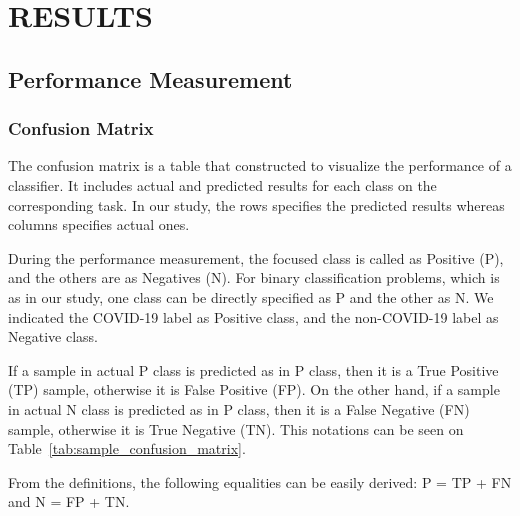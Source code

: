 \chapter{RESULTS}
\label{ch:CH6}

\section{Performance Measurement}

\subsection{Confusion Matrix}

The confusion matrix is a table that constructed to visualize the performance of a classifier. It includes actual and predicted results for each class on the corresponding task. In our study, the rows specifies the predicted results whereas columns specifies actual ones.

During the performance measurement, the focused class is called as Positive (P), and the others are as Negatives (N). For binary classification problems, which is as in our study, one class can be directly specified as P and the other as N. We indicated the COVID-19 label as Positive class, and the non-COVID-19 label as Negative class. 

If a sample in actual P class is predicted as in P class, then it is a True Positive (TP) sample, otherwise it is False Positive (FP). On the other hand, if a sample in actual N class is predicted as in P class, then it is a False Negative (FN) sample, otherwise it is True Negative (TN). This notations can be seen on Table~\ref{tab:sample_confusion_matrix}.

From the definitions, the following equalities can be easily derived: P = TP + FN and N = FP + TN.

